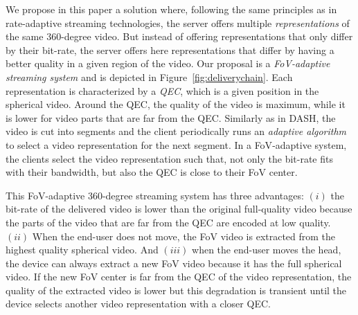 We propose in this paper a solution where, following the same principles as in
rate-adaptive streaming technologies, the server offers multiple \emph{representations}
of the same 360-degree video. But instead of offering representations that only differ by
their bit-rate, the server offers here representations that differ by
having a better quality in a given region of the video.
Our proposal is a \emph{FoV-adaptive streaming system} and is depicted in Figure~\ref{fig:deliverychain}.
Each representation is characterized by a \emph{\ac{QEC}}, which is a given
position in the spherical video. Around the \ac{QEC}, the quality of the video is maximum,
while it is lower for video parts that are far from the \ac{QEC}. Similarly as
in \ac{DASH}, the video is cut into segments and the client periodically runs
an \emph{adaptive algorithm} to select
a video representation for the next segment. In a \ac{FoV}-adaptive system, the clients select
the video representation such that, not only the bit-rate fits with their bandwidth, but also
the \ac{QEC} is close to their \ac{FoV} center.



This \ac{FoV}-adaptive 360-degree streaming system has three advantages:
$(i)$ the bit-rate of the delivered video is lower than the original full-quality video because the
parts of the video that are far from the \ac{QEC} are encoded at low quality.
$(ii)$ When the end-user does not move, the \ac{FoV} video is extracted from the highest
quality spherical video.
And $(iii)$ when the end-user moves the head, the device can
always extract
a new \ac{FoV} video because it has the full spherical video. If the
new \ac{FoV} center is far from the
\ac{QEC} of the video representation, the quality of the extracted video is lower but this
degradation is transient until the
device selects another video representation with a closer \ac{QEC}.

